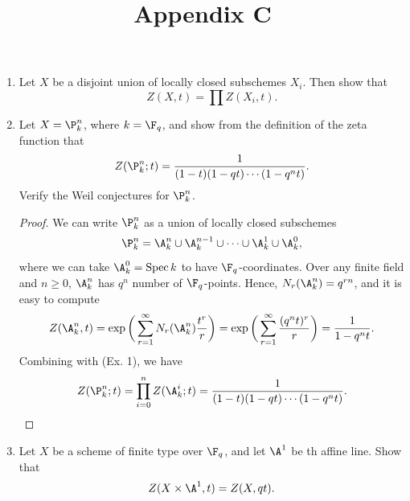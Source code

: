 \documentclass[a4paper]{article}
\title{Appendix C}
\begin{document}
\maketitle

\begin{enumerate} [label=\textbf{\arabic*.}, leftmargin=0em]

      \item Let $X$ be a disjoint union of locally closed subschemes $X_i$.
      Then show that
      \begin{equation*}
            Z(X, t) = \prod Z(X_i, t).
      \end{equation*}

      \item Let $X = \P^n_k$, where $k = \F_q$, and show from the definition of the zeta function that
      \begin{equation*}
            Z(\P^n_k; t) = \frac{1}{(1 - t)(1 - qt) \cdots (1 - q^n t)}.
      \end{equation*}
      Verify the Weil conjectures for $\P^n_k$.

      \begin{proof}
            We can write $\P^n_k$ as a union of locally closed subschemes
            \begin{equation*}
                  \P^n_k = \A^n_k \cup \A^{n - 1}_k \cup \cdots \cup \A^1_k \cup \A^0_k,
            \end{equation*}
            where we can take $\A^0_k = \spec{k}$ to have $\F_q$-coordinates.
            Over any finite field and $n \geq 0$, $\A^n_k$ has $q^n$ number of $\F_q$-points.
            Hence, $N_r(\A^n_k) = q^{rn}$, and it is easy to compute
            \begin{equation*}
                  Z(\A^n_k, t) = \exp\bigg(\sum_{r = 1}^\infty N_r(\A^n_k) \frac{t^r}{r}\bigg) = \exp\bigg(\sum_{r = 1}^\infty \frac{(q^n t)^r}{r}\bigg) = \frac{1}{1 - q^n t}.
            \end{equation*}
            Combining with (Ex. 1), we have
            \begin{equation*}
                  Z(\P^n_k; t) = \prod_{i = 0}^n Z(\A^i_k; t) = \frac{1}{(1 - t)(1 - qt) \cdots (1 - q^n t)}.
            \end{equation*}
      \end{proof}

      \item Let $X$ be a scheme of finite type over $\F_q$, and let $\A^1$ be th affine line.
      Show that
      \begin{equation*}
            Z(X \times \A^1, t) = Z(X, qt).
      \end{equation*}


\end{enumerate}
\end{document}
